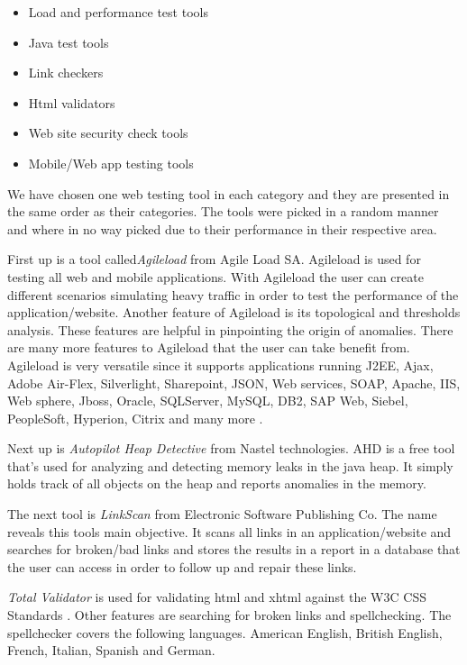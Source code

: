\documentclass[a4paper]{article}
\begin{document}
 \begin {itemize}
 \item Load and performance test tools  
 \item Java test tools 
 \item Link checkers 
 \item Html validators 
 \item Web site security check tools 
 \item Mobile/Web app testing tools
 \end {itemize}
 
We have chosen one web testing tool in each category and they are presented in the same order as their categories. 
The tools were picked in a random manner and where in no way picked due to their performance in their respective area.
 
First up is a tool called\emph {Agileload} from Agile Load SA. Agileload is used for testing all web and mobile applications.
With Agileload the user can create different scenarios simulating heavy traffic in order to test the performance of the
application/website. Another feature of Agileload is its topological and thresholds analysis. These features are helpful 
in pinpointing the origin of anomalies. There are many more features to Agileload that the user can take benefit from.
Agileload is very versatile since
it supports
applications
running J2EE,
Ajax, Adobe Air-Flex, Silverlight, Sharepoint, JSON, 
Web services, SOAP, Apache, IIS, Web sphere, Jboss, Oracle, SQLServer, MySQL, DB2, SAP Web, Siebel, PeopleSoft, Hyperion, 
Citrix and
many more \cite{agileload}.
 
Next up is \emph{Autopilot Heap Detective} from Nastel technologies.
AHD is a free tool that's used for analyzing and detecting 
memory leaks in the java heap. It simply holds track of all objects on the heap and reports anomalies in the memory. \cite{ahd}
 
The next tool is \emph{LinkScan} from Electronic Software Publishing Co. The name reveals this tools main objective. It scans all 
links in an application/website and searches for broken/bad links and stores the results in a report in a database that the 
user can access in order to follow up and repair these links. \cite{links} 
 
\emph {Total Validator} is used for validating html and xhtml against the W3C CSS Standards \cite{w3}. Other features are searching 
for broken links and spellchecking. The spellchecker covers the following languages. American English, British English,
French, Italian, Spanish and German.\cite{totval} 
\end{document}
